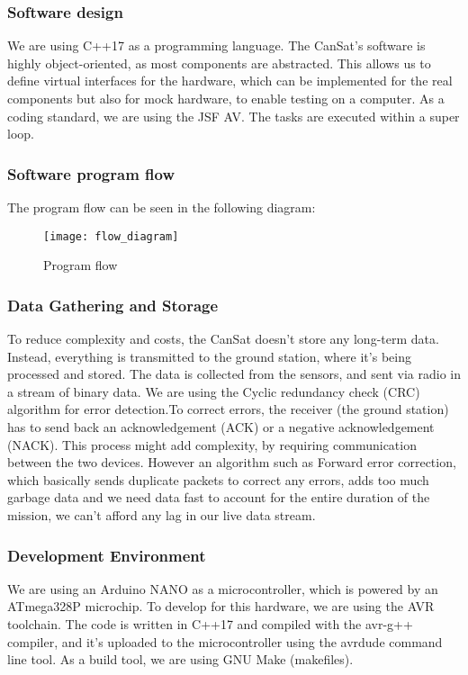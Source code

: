 \subsubsection{Software design}

We are using C++17 as a programming language. The CanSat's software is highly object-oriented, as most components are abstracted. This allows us to define virtual interfaces for the hardware, which can be implemented for the real components but also for mock hardware, to enable testing on a computer. As a coding standard, we are using the JSF AV. The tasks are executed within a super loop.

\subsubsection{Software program flow}

The program flow can be seen in the following diagram:

\begin{figure}[H]
\centering
\texttt{[image: flow\_diagram]}
\caption{Program flow}
\end{figure}

\subsubsection{Data Gathering and Storage}

To reduce complexity and costs, the CanSat doesn't store any long-term data. Instead, everything is transmitted to the ground station, where it's being processed and stored. The data is collected from the sensors, and sent via radio in a stream of binary data. We are using the Cyclic redundancy check (CRC) algorithm for error detection.To correct errors, the receiver (the ground station) has to send back an acknowledgement (ACK) or a negative acknowledgement (NACK). This process might add complexity, by requiring communication between the two devices. However an algorithm such as Forward error correction, which basically sends duplicate packets to correct any errors, adds too much garbage data and we need data fast to account for the entire duration of the mission, we can't afford any lag in our live data stream.

\subsubsection{Development Environment}

We are using an Arduino NANO as a microcontroller, which is powered by an ATmega328P microchip. To develop for this hardware, we are using the AVR toolchain. The code is written in C++17 and compiled with the avr-g++ compiler, and it's uploaded to the microcontroller using the avrdude command line tool. As a build tool, we are using GNU Make (makefiles).

